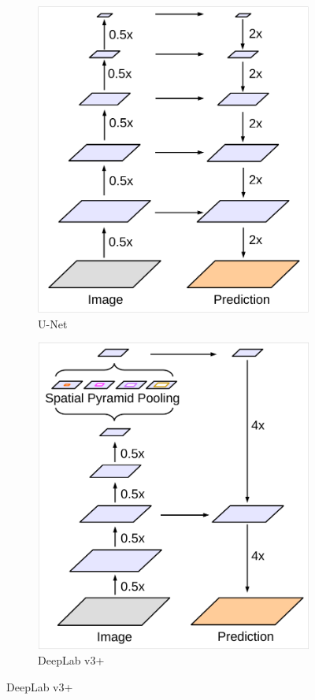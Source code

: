 \begin{description}
\begin{figure}[H]
\begin{subfigure}{0.3\linewidth}
                \includegraphics[width=0.9\linewidth]{./img/_deeplabv3plus_2.pdf}
                \caption{U-Net}
            \end{subfigure}
            \hfill
            \begin{subfigure}{0.3\linewidth}
                \centering
                \includegraphics[width=0.9\linewidth]{./img/_deeplabv3plus_3.pdf}
                \caption{DeepLab v3+}
            \end{subfigure}
        \end{figure}
\end{description}



